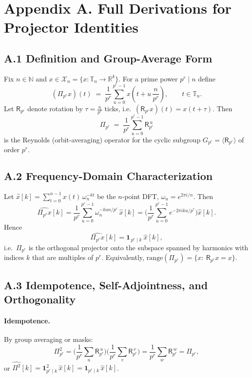\documentclass[12pt]{article}
\numberwithin{equation}{section}
\theoremstyle{plain}
\theoremstyle{definition}
\theoremstyle{remark}
\begin{document}
\appendix
\section*{Appendix A. Full Derivations for Projector Identities}

\subsection*{A.1 Definition and Group-Average Form}
Fix $n\in\mathbb{N}$ and $x\in\mathcal{X}_n=\{x:\mathbb{T}_n\to\mathbb{R}^k\}$. For a prime power $p^r\mid n$ define
\[
(\Pi_{p^r}x)(t)\;=\;\frac{1}{p^r}\sum_{u=0}^{p^r-1}x\!\left(t+u\,\frac{n}{p^r}\right),
\qquad t\in\mathbb{T}_n.
\]
Let $\mathsf{R}_{p^r}$ denote rotation by $\tau=\frac{n}{p^r}$ ticks, i.e.\ $(\mathsf{R}_{p^r}x)(t)=x(t+\tau)$. Then
\[
\Pi_{p^r}\;=\;\frac{1}{p^r}\sum_{u=0}^{p^r-1}\mathsf{R}_{p^r}^{\,u}
\]
is the Reynolds (orbit-averaging) operator for the cyclic subgroup $G_{p^r}=\langle \mathsf{R}_{p^r}\rangle$ of order $p^r$.

\subsection*{A.2 Frequency-Domain Characterization}
Let $\widehat{x}[k]=\sum_{t=0}^{n-1}x(t)\,\omega_n^{-kt}$ be the $n$-point DFT, $\omega_n=e^{2\pi i/n}$. Then
\[
\widehat{\Pi_{p^r}x}[k]
=\frac{1}{p^r}\sum_{u=0}^{p^r-1}\omega_n^{-k u n/p^r}\,\widehat{x}[k]
=\Bigg(\frac{1}{p^r}\sum_{u=0}^{p^r-1}e^{-2\pi i ku/p^r}\Bigg)\widehat{x}[k].
\]
Hence
\[
\widehat{\Pi_{p^r}x}[k]=\mathbf{1}_{\,p^r\mid k}\ \widehat{x}[k],
\]
i.e.\ $\Pi_{p^r}$ is the orthogonal projector onto the subspace spanned by harmonics with indices $k$ that are multiples of $p^r$. Equivalently, $\mathrm{range}(\Pi_{p^r})=\{x:\ \mathsf{R}_{p^r}x=x\}$.

\subsection*{A.3 Idempotence, Self-Adjointness, and Orthogonality}
\paragraph{Idempotence.} By group averaging or masks:
\[
\Pi_{p^r}^2=\Big(\frac{1}{p^r}\sum_{u}\mathsf{R}_{p^r}^{\,u}\Big)\Big(\frac{1}{p^r}\sum_{v}\mathsf{R}_{p^r}^{\,v}\Big)
=\frac{1}{p^r}\sum_{w}\mathsf{R}_{p^r}^{\,w}=\Pi_{p^r},
\]
or $\widehat{\Pi^2}[k]=\mathbf{1}_{p^r\mid k}^2\,\widehat{x}[k]=\mathbf{1}_{p^r\mid k}\,\widehat{x}[k]$.
\end{document}
